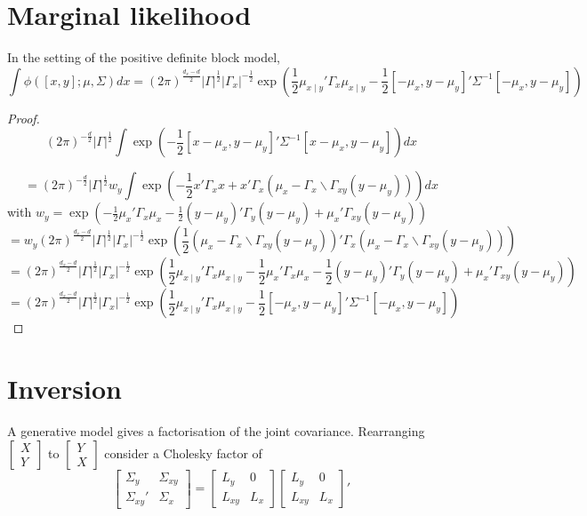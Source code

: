 \documentclass[11pt]{article}
\begin{document}
\section{Marginal likelihood}
In the setting of the positive definite block model,
\[
\int\phi([x,y]; \mu, \Sigma) d x 
= (2\pi)^{\tfrac{d_x - d}2}|\Gamma|^{\frac12} |\Gamma_x|^{-\frac12}   \exp\left(\frac12 \mu_{x\mid y}'\Gamma_x \mu_{x\mid y}
-\frac12[ - \mu_x, y - \mu_y]' \Sigma^{-1}[ - \mu_x, y - \mu_y]
\right) 
\]
\begin{proof}

\[
(2\pi)^{-\frac{d}2}|\Gamma|^{\frac12} \int \exp\left(-\frac12[x - \mu_x, y - \mu_y]' \Sigma^{-1}[x - \mu_x, y - \mu_y]\right) d x
\]

\[
=(2\pi)^{-\frac{d}2}|\Gamma|^{\frac12} w_y\int \exp\left(-\frac12x '\Gamma_x x + x' \Gamma_x (\mu_x - \Gamma_x\backslash \Gamma_{xy}(y - \mu_y))
\right) d x
\]
with $w_y = \exp\left(-\frac12 \mu_x'\Gamma_x \mu_x-\frac12(y - \mu_y)'\Gamma_y(y-\mu_y) + \mu_x' \Gamma_{xy}(y - \mu_y)\right)$
\[
= w_y (2\pi)^{\frac{d_x - d}2}|\Gamma|^{\frac12} |\Gamma_x|^{-\frac12}   \exp\left(\frac12 (\mu_x - \Gamma_x\backslash \Gamma_{xy}(y - \mu_y))'\Gamma_x (\mu_x - \Gamma_x\backslash \Gamma_{xy}(y - \mu_y))
\right)  
\]
\[
= (2\pi)^{\frac{d_x - d}2}|\Gamma|^{\frac12} |\Gamma_x|^{-\frac12}    \exp\left(\frac12 \mu_{x\mid y}'\Gamma_x \mu_{x\mid y}
-\frac12 \mu_x'\Gamma_x \mu_x-\frac12(y - \mu_y)'\Gamma_y(y-\mu_y) + \mu_x' \Gamma_{xy}(y - \mu_y)
\right)  
\]
\[
= (2\pi)^{\frac{d_x - d}2}|\Gamma|^{\frac12} |\Gamma_x|^{-\frac12}   \exp\left(\frac12 \mu_{x\mid y}'\Gamma_x \mu_{x\mid y}
-\frac12[ - \mu_x, y - \mu_y]' \Sigma^{-1}[ - \mu_x, y - \mu_y]
\right)  
\]
\end{proof}
\section{Inversion}


A generative model gives a factorisation of the joint covariance.
Rearranging $\begin{bmatrix}X\\Y\end{bmatrix}$ to $\begin{bmatrix}Y\\X\end{bmatrix}$ consider a Cholesky factor of  
\[
\begin{bmatrix}\Sigma_{y} & \Sigma_{xy} \\ \Sigma_{xy}' &\Sigma_{x} \end{bmatrix}
= \begin{bmatrix}L_{y} & 0 \\  L_{xy} &L_{x} \end{bmatrix} \begin{bmatrix}L_{y} & 0 \\  L_{xy} &L_{x} \end{bmatrix} '
\]
\end{document}
